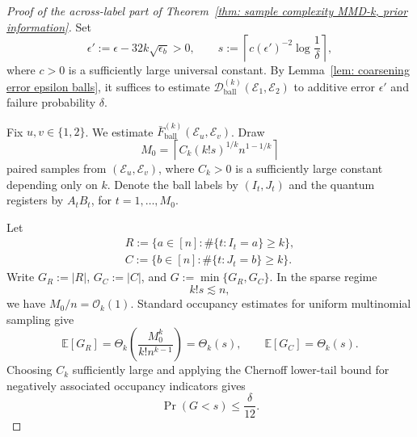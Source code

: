 \documentclass[aps,prx,reprint,superscriptaddress,amsmath,amssymb,longbibliography,floatfix]{revtex4-2}
\newcommand{\dsE}{\mathbb{E}}
\newcommand{\scD}{\mathcal{D}}
\newcommand{\scE}{\mathcal{E}}
\newcommand{\scO}{\mathcal{O}}
\theoremstyle{plain}
\theoremstyle{definition}
\theoremstyle{remark}
\begin{document}
\begin{proof}[Proof of the across-label part of Theorem~\ref{thm: sample complexity MMD-k, prior information}]
    Set
    \begin{equation}
        \epsilon'
        :=
        \epsilon-32k\sqrt{\epsilon_b}>0,
        \qquad
        s
        :=
        \left\lceil
            c(\epsilon')^{-2}\log\frac1\delta
        \right\rceil,
    \end{equation}
    where $c>0$ is a sufficiently large universal constant. By Lemma~\ref{lem: coarsening error epsilon balls}, it suffices to estimate
    $\scD^{(k)}_{\mathrm{ball}}(\scE_1,\scE_2)$ to additive error $\epsilon'$ and failure probability $\delta$.

    Fix $u,v\in\{1,2\}$. We estimate $\bar F^{(k)}_{\mathrm{ball}}(\scE_u,\scE_v)$. Draw
    \begin{equation}
        M_0
        =
        \left\lceil
            C_k (k!s)^{1/k} n^{1-1/k}
        \right\rceil
    \end{equation}
    paired samples from $(\scE_u,\scE_v)$, where $C_k>0$ is a sufficiently large constant depending only on $k$. Denote the ball labels by $(I_t,J_t)$ and the quantum registers by $A_tB_t$, for $t=1,\ldots,M_0$.

    Let
    \begin{equation}
\begin{gathered}
R:=\{a\in[n]:\#\{t:I_t=a\}\ge k\},
        \\
        C:=\{b\in[n]:\#\{t:J_t=b\}\ge k\}.
\end{gathered}
\end{equation}
    Write $G_R:=|R|$, $G_C:=|C|$, and $G:=\min\{G_R,G_C\}$. In the sparse regime
    \[
        k!s\lesssim n,
    \]
    we have $M_0/n=\scO_k(1)$. Standard occupancy estimates for uniform multinomial sampling give
    \begin{equation}
        \dsE[G_R]
        =
        \Theta_k\!\left(
            \frac{M_0^k}{k!n^{k-1}}
        \right)
        =
        \Theta_k(s),
        \qquad
        \dsE[G_C]
        =
        \Theta_k(s).
    \end{equation}
    Choosing $C_k$ sufficiently large and applying the Chernoff lower-tail bound for negatively associated occupancy indicators gives
    \begin{equation}
        \Pr(G<s)\le \frac{\delta}{12}.
        \label{eq: across enough row column collisions}
    \end{equation}


\end{proof}
\end{document}
